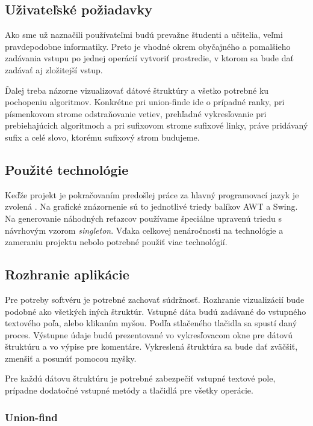 \subsection{Uživateľské požiadavky}

Ako sme už naznačili používateľmi budú prevažne študenti a učitelia, veľmi 
pravdepodobne informatiky. Preto je vhodné okrem obyčajného a pomalšieho 
zadávania vstupu po jednej operácií vytvoriť prostredie, v ktorom sa bude dať 
zadávať aj zložitejší vstup.

Ďalej treba názorne vizualizovať dátové štruktúry a všetko potrebné ku 
pochopeniu algoritmov. Konkrétne pri union-finde ide o prípadné ranky, 
pri písmenkovom strome odstraňovanie vetiev, prehľadné vykresľovanie pri 
prebiehajúcich algoritmoch a pri sufixovom strome sufixové linky, práve 
pridávaný sufix a celé slovo, ktorému sufixový strom budujeme.

\subsection{Použité technológie}

Keďže projekt je pokračovaním predošlej práce za hlavný programovací jazyk je 
zvolená \Java. Na grafické znázornenie sú to jednotlivé triedy balíkov AWT a 
Swing. Na generovanie náhodných reťazcov používame špeciálne upravenú triedu 
s návrhovým vzorom \emph{singleton}. Vďaka celkovej nenáročnosti na 
technológie a zameraniu projektu nebolo potrebné použiť viac technológií.

\subsection{Rozhranie aplikácie}

Pre potreby softvéru je potrebné zachovať súdržnosť. Rozhranie vizualizácií 
bude podobné ako všetkých iných štruktúr. Vstupné dáta budú zadávané do 
vstupného textového poľa, alebo klikaním myšou. Podľa stlačeného tlačidla sa 
spustí daný proces. Výstupne údaje budú prezentované vo vykresľovacom okne pre 
dátovú štruktúru a vo výpise pre komentáre. Vykreslená štruktúra sa bude dať 
zväčšiť, zmenšiť a posunúť pomocou myšky.

Pre každú dátovu štruktúru je potrebné zabezpečiť vstupné textové pole, 
prípadne dodatočné vstupné metódy a tlačidlá pre všetky operácie.

\subsubsection{Union-find}

